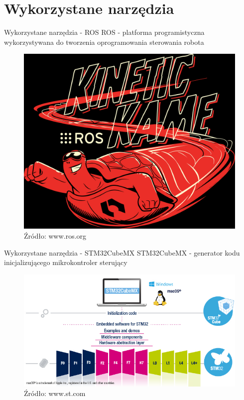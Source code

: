 \documentclass{beamer}
\begin{document}
\section{Wykorzystane narzędzia}
\begin{frame}{Wykorzystane narzędzia - ROS}
	ROS  - platforma programistyczna wykorzystywana do tworzenia oprogramowania sterowania robota
	\begin{figure}[h]
		\centering
		\includegraphics[height=0.6\textheight]{img/kinetic.png}
		\caption{Źródło: www.ros.org}
		\label{ros:kinetic}
	\end{figure}
\end{frame}

\begin{frame}{Wykorzystane narzędzia - STM32CubeMX}
	STM32CubeMX - generator kodu inicjalizującego mikrokontroler sterujący
	\begin{figure}[h]
		\centering
		\includegraphics[height=0.5\textheight]{img/stm32cubemx.jpg}
		\caption{Źródło: www.st.com}
		\label{ros:stm32cubemx}
	\end{figure}
\end{frame}
\end{document}
